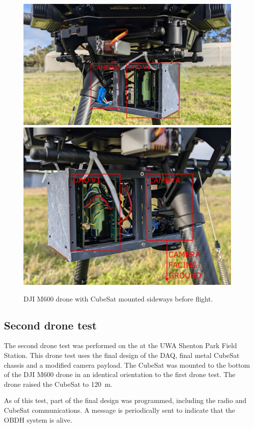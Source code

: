 \documentclass[]{report}
\begin{document}
\begin{figure}[H]
  \centering
  \includegraphics[width=0.9\linewidth]{images/1st_flight_drone_cube.jpg}
  \includegraphics[width=0.9\linewidth]{images/1st_flight_drone_cube_2.jpg}
  \caption{DJI M600 drone with CubeSat mounted sideways before flight.}
  \label{fig:drone-cube-1}
\end{figure}

\subsection{Second drone test}
The second drone test was performed on the  at the UWA Shenton Park Field Station. This drone test uses the final design of the DAQ, final metal CubeSat chassis and a modified camera payload. The CubeSat was mounted to the bottom of the DJI M600 drone in an identical orientation to the first drone test. The drone raised the CubeSat to \SI{120}{\metre}.

As of this test, part of the  final design was programmed, including the radio and CubeSat communications. A message is periodically sent to indicate that the OBDH system is alive.
\end{document}
